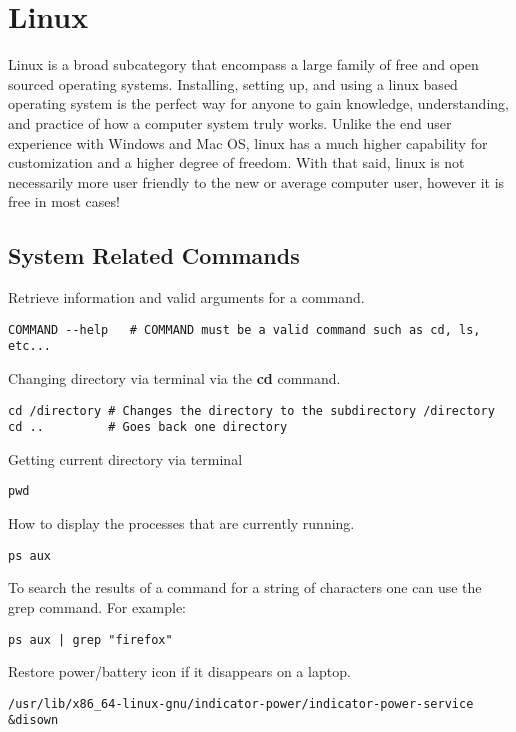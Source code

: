 \chapter{Linux}
\thispagestyle{fancy}
\lstset{language=Bash, style=bash}

Linux is a broad subcategory that encompass a large family of free and open sourced operating systems. Installing, setting up, and using a linux based operating system is the perfect way for anyone to gain knowledge, understanding, and practice of how a computer system truly works. Unlike the end user experience with Windows and Mac OS, linux has a much higher capability for customization and a higher degree of freedom. With that said, linux is not necessarily more user friendly to the new or average computer user, however it is free in most cases!

\section{System Related Commands}

Retrieve information and valid arguments for a command.
\begin{lstlisting}
COMMAND --help   # COMMAND must be a valid command such as cd, ls, etc...
\end{lstlisting}

Changing directory via terminal via the \textbf{cd} command.
\begin{lstlisting}
cd /directory # Changes the directory to the subdirectory /directory
cd ..         # Goes back one directory
\end{lstlisting}

Getting current directory via terminal
\begin{lstlisting}
pwd
\end{lstlisting}

How to display the processes that are currently running.
\begin{lstlisting}
ps aux
\end{lstlisting}

To search the results of a command for a string of characters one can use the grep command. For example:
\begin{lstlisting}
ps aux | grep "firefox"
\end{lstlisting}

Restore power/battery icon if it disappears on a laptop.
\begin{lstlisting}
/usr/lib/x86_64-linux-gnu/indicator-power/indicator-power-service &disown 
\end{lstlisting}

